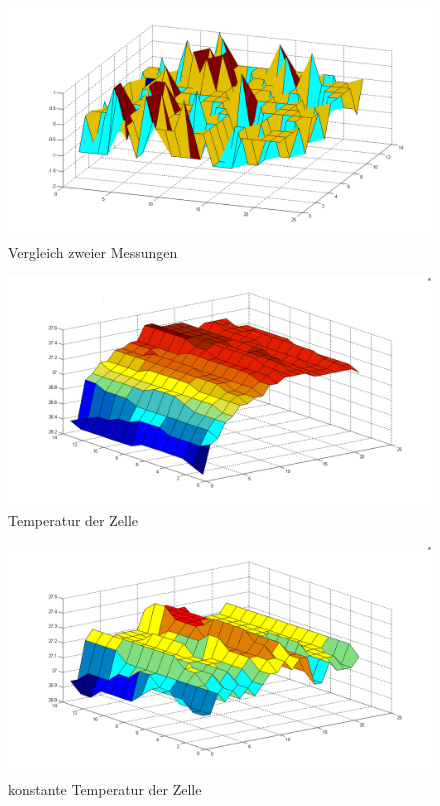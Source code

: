 \documentclass[a4paper,bibtotoc,oneside]{scrbook}
\begin{document}
\begin{figure}[htbp]
\centering
\includegraphics[width=150mm]{img/vergleich23.png}
\caption{Vergleich zweier Messungen}\label{vergleich}
\end{figure}

\begin{figure}[htbp]
\centering
\includegraphics[width=150mm]{img/tempm1.png}
\caption[Temperatur der Zelle]{Temperatur der Zelle}\label{tm1}
\end{figure}

\begin{figure}[htbp]
\centering
\includegraphics[width=150mm]{img/tempm2.png}
\caption[konstante Temperatur der Zelle]{konstante Temperatur der Zelle}\label{tm2}
\end{figure}
\end{document}
